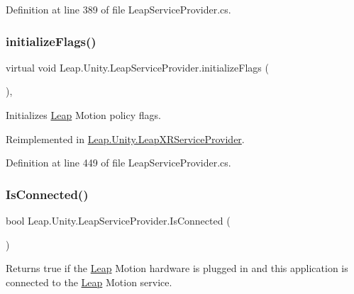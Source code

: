 Definition at line 389 of file Leap\+Service\+Provider.\+cs.

\mbox{\label{class_leap_1_1_unity_1_1_leap_service_provider_ac6ec54a97c1d2e1bbbe663822b458140}} 
\subsubsection{\texorpdfstring{initializeFlags()}{initializeFlags()}}
{\footnotesize\ttfamily virtual void Leap.\+Unity.\+Leap\+Service\+Provider.\+initialize\+Flags (\begin{DoxyParamCaption}{ }\end{DoxyParamCaption})\hspace{0.3cm}{\ttfamily [protected]}, {\ttfamily [virtual]}}



Initializes \mbox{\hyperlink{namespace_leap_1_1_unity_1_1_leap}{Leap}} Motion policy flags. 



Reimplemented in \mbox{\hyperlink{class_leap_1_1_unity_1_1_leap_x_r_service_provider_ae0e6b7d1c684d872acf237357ace286c}{Leap.\+Unity.\+Leap\+X\+R\+Service\+Provider}}.



Definition at line 449 of file Leap\+Service\+Provider.\+cs.

\mbox{\label{class_leap_1_1_unity_1_1_leap_service_provider_aeee4a41aefc20b7268f284340b6f793a}} 
\subsubsection{\texorpdfstring{IsConnected()}{IsConnected()}}
{\footnotesize\ttfamily bool Leap.\+Unity.\+Leap\+Service\+Provider.\+Is\+Connected (\begin{DoxyParamCaption}{ }\end{DoxyParamCaption})}



Returns true if the \mbox{\hyperlink{namespace_leap_1_1_unity_1_1_leap}{Leap}} Motion hardware is plugged in and this application is connected to the \mbox{\hyperlink{namespace_leap_1_1_unity_1_1_leap}{Leap}} Motion service. 



